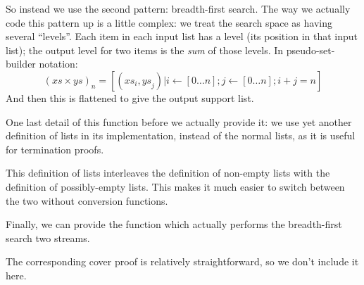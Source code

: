 So instead we use the second pattern: breadth-first search.
The way we actually code this pattern up is a little complex: we treat the
search space as having several ``levels''.
Each item in each input list has a level (its position in that input list); the
output level for two items is the \emph{sum} of those levels.
In pseudo-set-builder notation: 
\begin{equation*}
  (\mathit{xs}\times\mathit{ys})_n =
    \left[ (\mathit{xs}_i , \mathit{ys}_j) \vert i \leftarrow \left[ 0 \ldots n \right] ; j \leftarrow \left[ 0 \ldots n \right] ; i + j = n  \right]
\end{equation*}
And then this is flattened to give the output support list.

One last detail of this function before we actually provide it: we use yet
another definition of lists in its implementation, instead of the normal lists,
as it is useful for termination proofs.
\begin{agdalisting*}
  \begin{multicols}{2} \centering
     \columnbreak
  \end{multicols}
\end{agdalisting*}
This definition of lists interleaves the definition of non-empty lists with the
definition of possibly-empty lists.
This makes it much easier to switch between the two without conversion
functions.

Finally, we can provide the function which actually performs the breadth-first
search two streams.
\begin{agdalisting*}
\end{agdalisting*}
The corresponding cover proof is relatively straightforward, so we don't include
it here.
